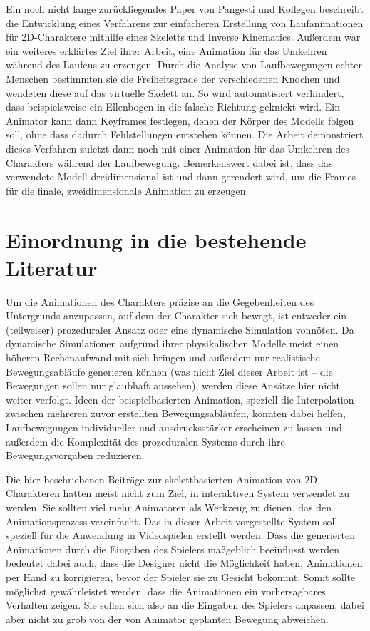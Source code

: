 Ein noch nicht lange zurückliegendes Paper von Pangesti und Kollegen \cite{pangesti2019analysis} beschreibt die Entwicklung eines Verfahrens zur einfacheren Erstellung von Laufanimationen für 2D-Charaktere mithilfe eines Skeletts und Inverse Kinematics. Außerdem war ein weiteres erklärtes Ziel ihrer Arbeit, eine Animation für das Umkehren während des Laufens zu erzeugen. Durch die Analyse von Laufbewegungen echter Menschen bestimmten sie die Freiheitsgrade der verschiedenen Knochen und wendeten diese auf das virtuelle Skelett an. So wird automatisiert verhindert, dass beispielsweise ein Ellenbogen in die falsche Richtung geknickt wird. Ein Animator kann dann Keyframes festlegen, denen der Körper des Modells folgen soll, ohne dass dadurch Fehlstellungen entstehen können. Die Arbeit demonstriert dieses Verfahren zuletzt dann noch mit einer Animation für das Umkehren des Charakters während der Laufbewegung. Bemerkenswert dabei ist, dass das verwendete Modell dreidimensional ist und dann gerendert wird, um die Frames für die finale, zweidimensionale Animation zu erzeugen.


\section{Einordnung in die bestehende Literatur}
Um die Animationen des Charakters präzise an die Gegebenheiten des Untergrunds anzupassen, auf dem der Charakter sich bewegt, ist entweder ein (teilweiser) prozeduraler Ansatz oder eine dynamische Simulation vonnöten. Da dynamische Simulationen aufgrund ihrer physikalischen Modelle meist einen höheren Rechenaufwand mit sich bringen und außerdem nur realistische Bewegungsabläufe generieren können (was nicht Ziel dieser Arbeit ist – die Bewegungen sollen nur glaubhaft aussehen), werden diese Ansätze hier nicht weiter verfolgt. Ideen der beispielbasierten Animation, speziell die Interpolation zwischen mehreren zuvor erstellten Bewegungsabläufen, könnten dabei helfen, Laufbewegungen individueller und ausdrucksstärker erscheinen zu lassen und außerdem die Komplexität des prozeduralen Systems durch ihre Bewegungsvorgaben reduzieren.

Die hier beschriebenen Beiträge zur skelettbasierten Animation von 2D-Charakteren hatten meist nicht zum Ziel, in interaktiven System verwendet zu werden. Sie sollten viel mehr Animatoren als Werkzeug zu dienen, das den Animationsprozess vereinfacht. Das in dieser Arbeit vorgestellte System soll speziell für die Anwendung in Videospielen erstellt werden. Dass die generierten Animationen durch die Eingaben des Spielers maßgeblich beeinflusst werden bedeutet dabei auch, dass die Designer nicht die Möglichkeit haben, Animationen per Hand zu korrigieren, bevor der Spieler sie zu Gesicht bekommt. Somit sollte möglichst gewährleistet werden, dass die Animationen ein vorhersagbares Verhalten zeigen. Sie sollen sich also an die Eingaben des Spielers anpassen, dabei aber nicht zu grob von der von Animator geplanten Bewegung abweichen.


